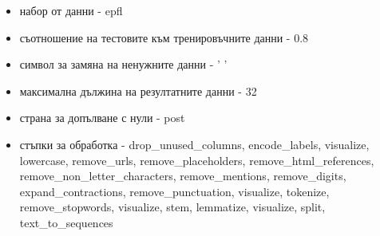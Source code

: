 \documentclass{article}
\begin{document}
\begin{itemize}
\begin{itemize}
\item набор от данни - epfl
\item съотношение на тестовите към тренировъчните данни - 0.8
\item символ за замяна на ненужните данни - ' '
\item максимална дължина на резултатните данни - 32
\item страна за допълване с нули - post
\item стъпки за обработка - drop\_unused\_columns, encode\_labels, visualize, lowercase, remove\_urls,
remove\_placeholders, remove\_html\_references, remove\_non\_letter\_characters, remove\_mentions,
remove\_digits, expand\_contractions, remove\_punctuation, visualize, tokenize, remove\_stopwords, visualize,
stem, lemmatize, visualize, split, text\_to\_sequences
\end{itemize}


\end{itemize}
\end{document}

